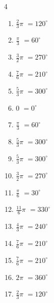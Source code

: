 \begin{multicols}{4}
\begin{enumerate}
  \item $\displaystyle \frac{2}{3}\pi$
        $\displaystyle =120^{\circ}$

  \item $\displaystyle \frac{\pi}{3}$
        $\displaystyle =60^{\circ}$

  \item $\displaystyle \frac{3}{2}\pi$
        $\displaystyle =270^{\circ}$

  \item $\displaystyle \frac{7}{6}\pi$
        $\displaystyle =210^{\circ}$

  \item $\displaystyle \frac{5}{3}\pi$
        $\displaystyle =300^{\circ}$

  \item $\displaystyle 0$
        $\displaystyle =0^{\circ}$

  \item $\displaystyle \frac{\pi}{3}$
        $\displaystyle =60^{\circ}$

  \item $\displaystyle \frac{5}{3}\pi$
        $\displaystyle =300^{\circ}$

  \item $\displaystyle \frac{5}{3}\pi$
        $\displaystyle =300^{\circ}$

  \item $\displaystyle \frac{3}{2}\pi$
        $\displaystyle =270^{\circ}$

  \item $\displaystyle \frac{\pi}{6}$
        $\displaystyle =30^{\circ}$

  \item $\displaystyle \frac{11}{6}\pi$
        $\displaystyle =330^{\circ}$

  \item $\displaystyle \frac{4}{3}\pi$
        $\displaystyle =240^{\circ}$

  \item $\displaystyle \frac{7}{6}\pi$
        $\displaystyle =210^{\circ}$

  \item $\displaystyle \frac{7}{6}\pi$
        $\displaystyle =210^{\circ}$

  \item $\displaystyle 2\pi$
        $\displaystyle =360^{\circ}$

  \item $\displaystyle \frac{2}{3}\pi$
        $\displaystyle =120^{\circ}$


\end{enumerate}
\end{multicols}
